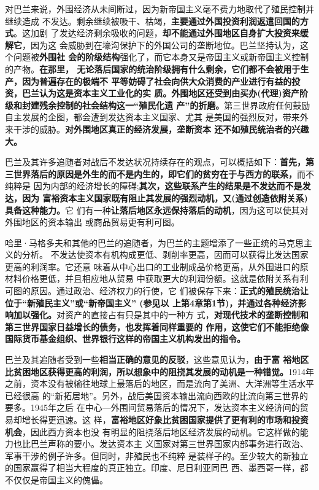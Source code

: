 对巴兰来说，外围经济从未间断过，因为新帝国主义毫不费力地取代了殖民控制并继续造成
不发达。剩余继续被吸干、枯竭，\textbf{主要通过外国投资利润返遣回国的方式}。这加剧
了发达经济剩余吸收的问题，\textbf{却不能通过外围地区自身扩大投资来缓解它}，因为这
会威胁到在壕沟保护下的外国公司的垄断地位。巴兰坚持认为，这个问题被\textbf{外围社
  会的阶级结构}强化了，而它本身又是帝国主义或新帝国主义控制的产物。\textbf{在那里，
  无论落后国家的统治阶级拥有什么剩余，它们都不会被用于生产，因为普遍存在的极端不
  平等妨碍了社会向供大众消费的产业进行有益的投资，巴兰认为这是资本主义工业化的实
  质。外围地区还受到由买办(代理)资产阶级和封建残余控制的社会结构这一“殖民化遗
  产”的折磨。}第三世界政府任何鼓励自主发展的企图，都会遭到发达资本主义国家、尤其
是美国的强烈反对，带来外来干涉的威胁。\textbf{对外围地区真正的经济发展，垄断资本
  还不如殖民统治者的兴趣大。}

巴兰及其许多追随者对战后不发达状况持续存在的观点，可以概括如下：\textbf{首先，第
  三世界落后的原因是外生的而不是内生的，即它们的贫穷在于与西方的联系，}而不纯粹是
因为内部的经济增长的障碍;\textbf{其次，这些联系产生的结果是不发达而不是发达，因为
  富裕资本主义国家既有阻止其发展的强烈动机，又(通过创造依附关系)具备这种能力。}它
们有一种\textbf{让落后地区永远保持落后的动机}，因为这可以使其对外围地区的资本输出
或商品贸易更有利可图。

哈里·马格多夫和其他的巴兰的追随者，为巴兰的主题增添了一些正统的马克思主义的分析。
不发达使资本有机构成更低、剥削率更高，因而可以获得比发达国家更高的利润率。它还意
味着从中心出口的工业制成品价格更高，从外围进口的原材料价格更低，并且相应地从贸易
中获取更大的利润份额。这就是依附关系有利可图的原因。通过政治、经济权力的行使，它
们被保存下来：\textbf{正式的殖民统治让位于“新殖民主义”或“新帝国主义” (参见以
  上第4章第1节)，并通过各种经济影响加以强化。}对资产的直接占有只是其中的一种方
式，\textbf{对现代技术的垄断控制和第三世界国家日益增长的债务，也发挥着同样重要的
  作用，这使它们不能拒绝像国际货币基金组织、世界银行这样的帝国主义机构发出的指令。}

巴兰及其追随者受到一些\textbf{相当正确的意见的反驳}，这些意见认为，\textbf{由于富
  裕地区比贫困地区获得更高的利润，所以想象中的阻挠其发展的动机是一种错觉。}1914年
之前，资本没有被输往地球上最落后的地区，而是流向了美洲、大洋洲等生活水平已经很高
的“新拓居地”。另外，战后美国资本输出流向西欧的比流向第三世界的要多。1945年之后
在中心—外围间贸易落后的情况下，发达资本主义经济间的贸易却增长得更迅速。这
样，\textbf{富裕地区好象比贫困国家提供了更有利的市场和投资机会}，因此西方资本也没
有明显的阻挠落后地区经济发展的动机。它这样做的能力也比巴兰声称的要小。发达资本主
义国家对第三世界国家内部事务进行政治、军事干涉的例子许多。但同时，非殖民也不纯粹
是装样子的。至少较大的新独立的国家赢得了相当大程度的真正独立。印度、尼日利亚同巴
西、墨西哥一样，都不仅仅是帝国主义的傀儡。

